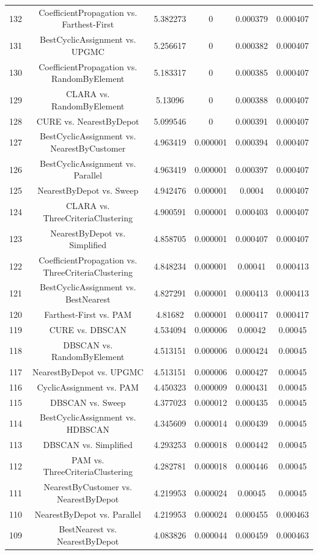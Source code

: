 \documentclass[a4paper,10pt]{article}
\begin{document}
\begin{landscape}
\begin{table}[!htp]
\begin{tabular}{cccccc}
132&CoefficientPropagation vs. Farthest-First&5.382273&0&0.000379&0.000407\\
131&BestCyclicAssignment vs. UPGMC&5.256617&0&0.000382&0.000407\\
130&CoefficientPropagation vs. RandomByElement&5.183317&0&0.000385&0.000407\\
129&CLARA vs. RandomByElement&5.13096&0&0.000388&0.000407\\
128&CURE vs. NearestByDepot&5.099546&0&0.000391&0.000407\\
127&BestCyclicAssignment vs. NearestByCustomer&4.963419&0.000001&0.000394&0.000407\\
126&BestCyclicAssignment vs. Parallel&4.963419&0.000001&0.000397&0.000407\\
125&NearestByDepot vs. Sweep&4.942476&0.000001&0.0004&0.000407\\
124&CLARA vs. ThreeCriteriaClustering&4.900591&0.000001&0.000403&0.000407\\
123&NearestByDepot vs. Simplified&4.858705&0.000001&0.000407&0.000407\\
122&CoefficientPropagation vs. ThreeCriteriaClustering&4.848234&0.000001&0.00041&0.000413\\
121&BestCyclicAssignment vs. BestNearest&4.827291&0.000001&0.000413&0.000413\\
120&Farthest-First vs. PAM&4.81682&0.000001&0.000417&0.000417\\
119&CURE vs. DBSCAN&4.534094&0.000006&0.00042&0.00045\\
118&DBSCAN vs. RandomByElement&4.513151&0.000006&0.000424&0.00045\\
117&NearestByDepot vs. UPGMC&4.513151&0.000006&0.000427&0.00045\\
116&CyclicAssignment vs. PAM&4.450323&0.000009&0.000431&0.00045\\
115&DBSCAN vs. Sweep&4.377023&0.000012&0.000435&0.00045\\
114&BestCyclicAssignment vs. HDBSCAN&4.345609&0.000014&0.000439&0.00045\\
113&DBSCAN vs. Simplified&4.293253&0.000018&0.000442&0.00045\\
112&PAM vs. ThreeCriteriaClustering&4.282781&0.000018&0.000446&0.00045\\
111&NearestByCustomer vs. NearestByDepot&4.219953&0.000024&0.00045&0.00045\\
110&NearestByDepot vs. Parallel&4.219953&0.000024&0.000455&0.000463\\
109&BestNearest vs. NearestByDepot&4.083826&0.000044&0.000459&0.000463\\

\end{tabular}
\end{table}
\end{landscape}
\end{document}
